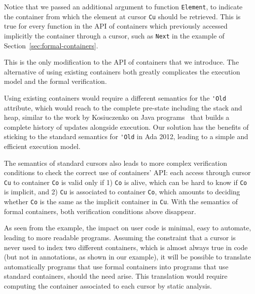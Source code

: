 \documentclass[runningheads,a4paper]{llncs}
\begin{document}
Notice that we passed an additional argument to function \verb|Element|, to
indicate the container from which the element at cursor \verb|Cu| should be
retrieved. This is true for every function in the API of containers which
previously accessed implicitly the container through a cursor, such as 
\verb|Next| in the example of Section~\ref{sec:formal-containers}.


This is the only modification to the API of containers that we introduce. The
alternative of using existing containers both greatly complicates the execution
model and the formal verification.

Using existing containers would require a different semantics for the \verb|'Old|
attribute, which would reach to the complete pre-state including the stack and
heap, similar to the work by Kosiuczenko on Java
programs~\cite{kosiuczenko:2010:mpc} that builds a complete history of updates
alongside execution. Our solution has the benefits of sticking to the standard
semantics for \verb|'Old| in Ada 2012, leading to a simple and efficient execution model.

The semantics of standard cursors also leads to more complex verification
conditions to check the correct use of containers' API: each access through
cursor \verb|Cu| to container \verb|Co| is valid only if 1) \verb|Co| is alive,
which can be hard to know if \verb|Co| is implicit, and 2) \verb|Cu| is
associated to container \verb|Co|, which amounts to deciding whether \verb|Co|
is the same as the implicit container in \verb|Cu|. With the semantics of
formal containers, both verification conditions above disappear.

\ifdefined\longversion
As seen from the example, the impact on user code is minimal, easy to automate,
leading to more readable programs. Assuming the constraint that a cursor is
never used to index two different containers, which is almost always true in
code (but not in annotations, as shown in our example), it will be possible to
translate automatically programs that use formal containers into programs that
use standard containers, should the need arise. This translation would require
computing the container associated to each cursor by static analysis.
\fi
\end{document}
